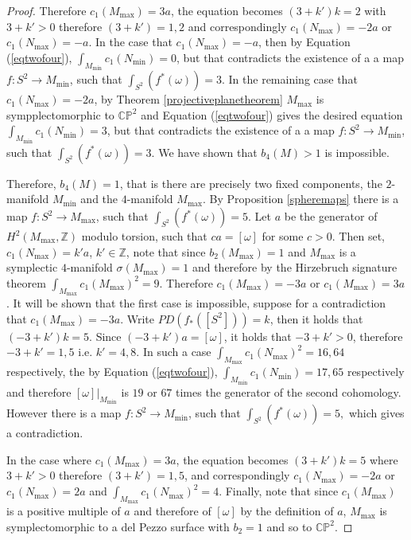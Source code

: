 \documentclass[12pt]{article}
\begin{document}
\begin{proof}
Therefore $c_{1}(M_{\max} ) =3a$, the equation becomes $(3+k')k=2$ with  $3+k'>0$ therefore $(3+k') =1,2$ and correspondingly $c_{1}(N_{\max}) = -2a$ or  $c_{1}(N_{\max}) = -a$. In the case that $c_{1}(N_{\max}) = -a$, then by Equation (\ref{eqtwofour}), $\int_{M_{\min}} c_{1}(N_{\min}) = 0$, but that contradicts the existence of a a map  $f: S^2 \rightarrow M_{\min}$, such that $\int_{S^2} (f^{*}(\omega) ) = 3$. In the remaining case that $c_{1}(N_{\max}) = -2a$, by Theorem \ref{projectiveplanetheorem} $M_{\max}$ is sympplectomorphic to $\mathbb{CP}^2$ and Equation  (\ref{eqtwofour}) gives the desired equation  $\int_{M_{\min}} c_{1}(N_{\min}) = 3$, but that contradicts the existence of a a map  $f: S^2 \rightarrow M_{\min}$, such that $\int_{S^2} (f^{*}(\omega) ) = 3$. We have shown that $b_{4}(M)>1$ is impossible.

Therefore, $b_{4}(M)=1$, that is there are precisely two fixed components, the $2$-manifold $M_{\min}$ and the $4$-manifold $M_{\max}$. By Proposition \ref{spheremaps}  there is a map $f: S^2 \rightarrow M_{\max}$, such that $\int_{S^2} (f^{*}(\omega) ) = 5.$ Let $a$ be the generator of $H^{2}(M_{\max},\mathbb{Z})$ modulo torsion, such that $ca = [\omega]$ for some $c>0$. Then set, $c_{1}(N_{\max}) = k'a$, $k' \in \mathbb{Z}$, note that since $b_{2}(M_{\max})=1$ and $M_{\max}$ is a symplectic $4$-manifold $\sigma(M_{\max})=1$ and therefore by the Hirzebruch signature theorem $\int_{M_{\max}} c_{1}(M_{\max})^2 = 9$. Therefore $c_{1}(M_{\max}) = -3a$ or $c_{1}(M_{\max}) = 3a$. It will be shown that the first case is impossible, suppose for a contradiction that  $c_{1}(M_{\max}) = -3a$.  Write $PD(f_{*}([S^2])) = k$, then it holds that $(-3+ k')k = 5$. Since $(-3+k')a = [\omega]$, it holds that $-3+k'>0$, therefore $-3+k'=1,5$ i.e. $k' = 4,8$. In such a case $\int_{M_{\max}} c_{1}(N_{\max})^2=16,64$ respectively, the  by Equation (\ref{eqtwofour}), $\int_{M_{\min}} c_{1}(N_{\min}) = 17,65$ respectively and therefore $[\omega]|_{M_{\min}}$ is $19$ or $67$ times the generator of the second cohomology. However there is a map $f: S^2 \rightarrow M_{\min}$, such that $\int_{S^2} (f^{*}(\omega) ) = 5,$ which gives a contradiction.

 In the case where $c_{1}(M_{\max}) = 3a$, the equation becomes $(3+k')k=5$ where $3+k'>0$ therefore $(3+k') =1,5$, and correspondingly $c_{1}(N_{\max}) = -2a$ or  $c_{1}(N_{\max}) = 2a$ and $\int_{M_{\max}} c_{1}(N_{\max})^2 =4$. Finally, note that since $c_{1}(M_{\max})$ is a positive multiple of $a$ and therefore of $[\omega]$ by the definition of $a$, $M_{\max}$ is symplectomorphic to a del Pezzo surface with $b_{2}=1$ and so to $\mathbb{CP}^2$.  
\end{proof}
\end{document}
